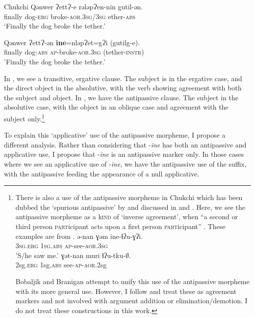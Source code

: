 \documentclass[output=paper,colorlinks,citecolor=brown,nonflat]{./langscibook}
\begin{document}
    
   \ea Chukchi \citep{KozinskyNedjalkovPolinskaja1988} \label{ex:basilico:2}
    \ea \label{ex:basilico:2a}
    \gll Qǝnwer  ɁettɁ-e  rǝlǝpɁen-nin    gutil-ǝn. \\ 
    finally  dog-\textsc{erg} broke-\textsc{aor}.\textsc{3sg}/\textsc{3sg}  ether{}-\textsc{abs}\\
    \glt ‘Finally the dog broke the tether.’
    
    \ex \label{ex:basilico:2b}
    \gll Qǝnwer  ɁettɁ-ǝn  \textbf{ine}=nlǝpɁet=gɁi  (gutilg-e).\\
    finally  dog-\textsc{abs}  \textsc{ap}{}-broke-\textsc{aor}.\textsc{3sg}  (tether-\textsc{instr})\\
    \glt 'Finally the dog broke the tether.'
    \z
    \z
    
 
In , we see a transitive, ergative clause. The subject is in the ergative case, and the direct object in the absolutive, with the verb showing agreement with both the subject and object. In , we have the antipassive clause. The subject in the absolutive case, with the object in an oblique case and agreement with the subject only.\footnote{There is also a use of the antipassive morpheme in Chukchi which has been dubbed the ‘spurious antipassive’ by \citet{Hale2002} and discussed in \citet{BobaljikBranigan2006} and \citet{Bobaljik2007}. Here, we see the antipassive morpheme as a k\textsc{ind} of ‘inverse agreement’, when “a second or third person \textsc{part}icipant acts upon a first person \textsc{part}icipant” \citep{Polinsky2016}. These examples are from \citet{Polinsky2016}.
\ea \label{ex:basilico:fn}
\gll ə-nan ɣəm ine-ɬʔu-ɣʔi. \\
3\textsc{sg.\textsc{erg}} 1\textsc{sg.\textsc{abs}} \textsc{ap}-see-\textsc{{aor}}.3\textsc{sg}\\
\glt  'S/he saw me.'
\z
\ea \label{ex:basilico:fn2}
\gll ɣət-nan   muri     ɬʔu-tku-\textrm{${\emptyset}$}.    \\
2\textrm{sg}.\textrm{\textsc{erg}}  1\textrm{sg.\textsc{abs}} see-\textrm{\textsc{ap}-\textsc{aor}}.2\textrm{sg}\\
\glt  
\z
	
Bobaljik and Branigan attempt to unify this use of the antipassive morpheme with its more general use. However, I follow \citet{Polinsky2016} and treat these as agreement markers and not involved with argument addition or elimination/demotion. I do not treat these constructions in this work.} 

To explain this ‘applicative’ use of the antipassive morpheme, I propose a different analysis. Rather than considering that -\textit{ine} has both an antipassive and applicative use, I propose that -\textit{ine} is an antipassive marker only. In those cases where we see an applicative use of -\textit{ine}, we have the antipassive use of the suffix, with the antipassive feeding the appearance of a null applicative.
\end{document}
